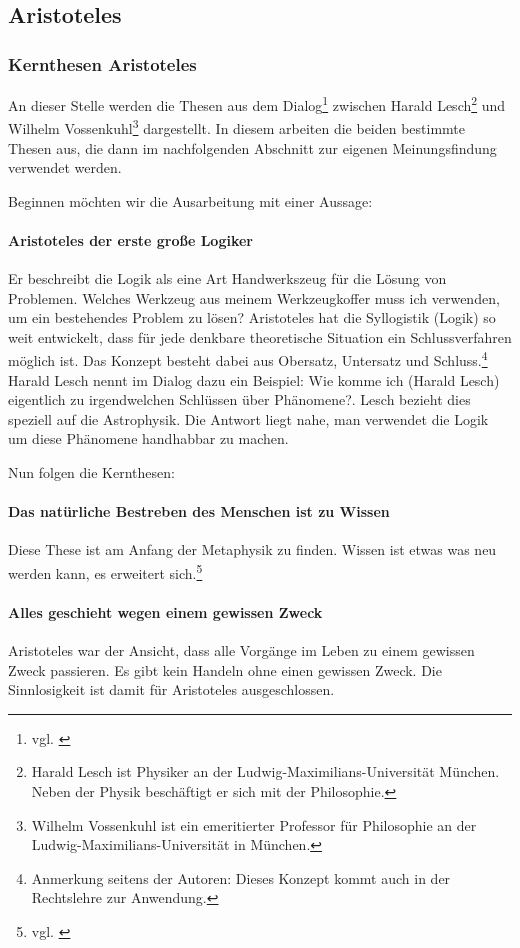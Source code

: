 \subsection{Aristoteles}

\subsubsection{Kernthesen Aristoteles}

An dieser Stelle werden die Thesen aus dem Dialog\footnote{vgl. \cite{Aristoteles3}} zwischen Harald Lesch\footnote{Harald Lesch ist Physiker an der Ludwig-Maximilians-Universität München. Neben der Physik beschäftigt er sich mit der Philosophie.} und Wilhelm Vossenkuhl\footnote{Wilhelm Vossenkuhl ist ein emeritierter Professor für Philosophie an der Ludwig-Maximilians-Universität in München.} dargestellt. In diesem arbeiten die beiden bestimmte Thesen aus, die dann im nachfolgenden Abschnitt zur eigenen Meinungsfindung verwendet werden.

Beginnen möchten wir die Ausarbeitung mit einer Aussage:
\paragraph{\glqq Aristoteles der erste große Logiker\grqq}
Er beschreibt die Logik als eine Art Handwerkszeug für die Lösung von Problemen. Welches Werkzeug aus meinem Werkzeugkoffer muss ich verwenden, um ein bestehendes Problem zu lösen? Aristoteles hat die Syllogistik (Logik) so weit entwickelt, dass für jede denkbare theoretische Situation ein Schlussverfahren möglich ist. Das Konzept besteht dabei aus Obersatz, Untersatz und Schluss.\footnote{Anmerkung seitens der Autoren: Dieses Konzept kommt auch in der Rechtslehre zur Anwendung.} Harald Lesch nennt im Dialog dazu ein Beispiel: \glqq Wie komme ich (Harald Lesch) eigentlich zu irgendwelchen Schlüssen über Phänomene?\grqq. Lesch bezieht dies speziell auf die Astrophysik. Die Antwort liegt nahe, man verwendet die Logik um diese Phänomene handhabbar zu machen.

Nun folgen die Kernthesen:
\paragraph{Das natürliche Bestreben des Menschen ist zu Wissen}
Diese These ist am Anfang der Metaphysik zu finden. Wissen ist etwas was neu werden kann, es erweitert sich.\footnote{vgl. \cite{AristotelesWissen}}  

\paragraph{Alles geschieht wegen einem gewissen Zweck} 
Aristoteles war der Ansicht, dass alle Vorgänge im Leben zu einem gewissen Zweck passieren. Es gibt kein Handeln ohne einen gewissen Zweck. Die Sinnlosigkeit ist damit für Aristoteles ausgeschlossen.

